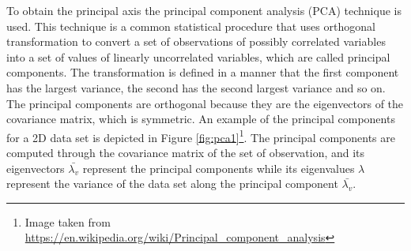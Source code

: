 To obtain the principal axis the principal component analysis (PCA) \citep{PCA} technique is used. This technique is a common statistical procedure that uses orthogonal transformation to convert a set of  observations of possibly correlated variables into a set of values of linearly uncorrelated variables, which are called principal components. The transformation is defined in a manner that the first component has the largest variance, the second has the second largest variance and so on. The principal components are orthogonal because they are the eigenvectors of the covariance matrix, which is symmetric. An example of the principal components for a 2D data set is depicted in Figure \ref{fig:pca1}\footnote{Image taken from \href{https://en.wikipedia.org/wiki/Principal_component_analysis}{https://en.wikipedia.org/wiki/Principal\_component\_analysis}}. The principal components are computed through the covariance matrix of the set of observation, and its eigenvectors $\bar{\lambda_v}$ represent the principal components while its eigenvalues $\lambda$ represent the variance of the data set along the principal component $\bar{\lambda_v}$. 

